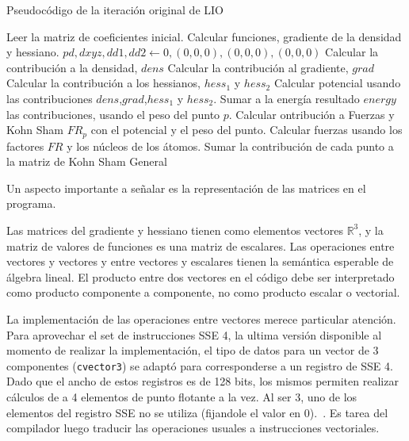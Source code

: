 \begin{algorithm}[H]
        \caption{Pseudoc\'odigo de la iteraci\'on original de LIO}
        \label{algo:lio-iteration}
        \begin{algorithmic}
              \State Leer la matriz de coeficientes inicial.
              \State Calcular funciones, gradiente de la densidad y hessiano.
                  \State $pd, dxyz,dd1,dd2 \gets 0, (0,0,0), (0,0,0), (0,0,0)$
                       \State Calcular la contribuci\'on a la densidad, $dens$
                       \State Calcular la contribuci\'on al gradiente, $grad$
                       \State Calcular la contribuci\'on a los hessianos, $hess_1$ y $hess_2$
                  \EndFor
                  \State Calcular potencial usando las contribuciones $dens$,$grad$,$hess_1$ y $hess_2$.
                  \State Sumar a la energ\'ia resultado $energy$ las contribuciones, usando el peso del punto $p$.
                  \State Calcular ontribuci\'on a Fuerzas y Kohn Sham $FR_p$ con el potencial y el peso del punto.
              \EndFor
              \State Calcular fuerzas usando los factores $FR$ y los n\'ucleos de los \'atomos.
              \State Sumar la contribuci\'on de cada punto a la matriz de Kohn Sham General
            \EndFunction
        \end{algorithmic}
\end{algorithm}

Un aspecto importante a se\~nalar es la representaci\'on de las matrices en el
programa.

Las matrices del gradiente y hessiano tienen como elementos vectores $\mathbb{R}^3$, y
la matriz de valores de funciones es una matriz de escalares. Las operaciones entre
vectores y vectores y entre vectores y escalares tienen la sem\'antica esperable de \'algebra
lineal. El producto entre dos vectores en el c\'odigo debe ser interpretado como producto
componente a componente, no como producto escalar o vectorial.

La implementaci\'on de las operaciones entre vectores merece particular atenci\'on.
Para aprovechar el set de instrucciones SSE 4, la ultima versi\'on disponible al
momento de realizar la implementaci\'on, el tipo de datos para un vector de 3
componentes (\texttt{cvector3}) se adapt\'o para corresponderse a un
registro de SSE 4. Dado que el ancho de estos registros es de 128 bits, los mismos
permiten realizar c\'alculos de a 4 elementos de punto flotante a la vez. Al ser 3, uno de los
elementos del registro SSE no se utiliza (fijandole el valor en 0).~\cite{LIO}.
Es tarea del compilador luego traducir las operaciones usuales a instrucciones
vectoriales.

